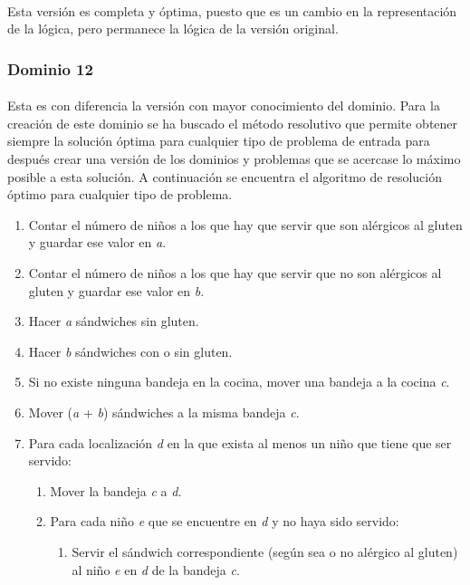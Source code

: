 \documentclass{article}
\begin{document}
\paragraph{}
Esta versión es completa y óptima, puesto que es un cambio en la representación de la lógica, pero permanece la lógica de la versión original.

\subsubsection{Dominio 12}

\paragraph{}
Esta es con diferencia la versión con mayor conocimiento del dominio. Para la creación de este dominio se ha buscado el método resolutivo que permite obtener siempre la solución óptima para cualquier tipo de problema de entrada para después crear una versión de los dominios y problemas que se acercase lo máximo posible a esta solución. A continuación se  encuentra el algoritmo de resolución óptimo para cualquier tipo de problema.

\begin{enumerate}
    \item Contar el número de niños a los que hay que servir que son alérgicos al gluten y guardar ese valor en \textit{a}.
    \item Contar el número de niños a los que hay que servir que no son alérgicos al gluten y guardar ese valor en \textit{b}.
    \item Hacer \textit{a} sándwiches sin gluten.
    \item Hacer \textit{b} sándwiches con o sin gluten.
    \item Si no existe ninguna bandeja en la cocina, mover una bandeja a la cocina \textit{c}.
    \item Mover (\textit{a} + \textit{b}) sándwiches a la misma bandeja \textit{c}.
    \item Para cada localización \textit{d} en la que exista al menos un niño que tiene que ser servido:
    \begin{enumerate}
        \item Mover la bandeja \textit{c} a \textit{d}.
        \item Para cada niño \textit{e} que se encuentre en \textit{d} y no haya sido servido:
        \begin{enumerate}
            \item Servir el sándwich correspondiente (según sea o no alérgico al gluten) al niño \textit{e} en \textit{d} de la bandeja \textit{c}. 
        \end{enumerate}
    \end{enumerate}
\end{enumerate}
\end{document}
